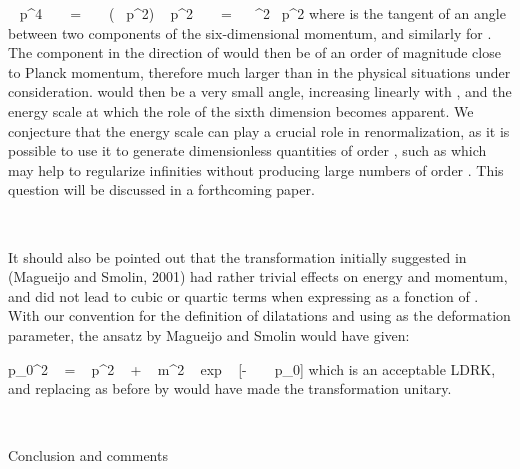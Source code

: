 \documentclass[a4paper,12pt,dvips]{article}
\makeatletter
\renewcommand{\section}{\@startsection{section}{1}{0in}
	{0.4\baselineskip}{0.1\baselineskip}{\Large\bf}}
\makeatother
\begin{document}
\equation
\epsilon ~ p^4 ~ ~ = ~ ~ (\epsilon ~ p^2) ~ p^2 ~ ~ = ~ ~\Omega ^2~ p^2
\endequation
\noindent 
where \coordHE{} is the tangent of an angle between two components of the six-dimensional momentum, and similarly for \coordHE{}. The component in the direction of \coordHE{} would then be of an order of magnitude close to Planck momentum, therefore much larger than \coordHE{} in the physical situations under consideration. \myHighlight{$\Omega $}\coordHE{} would then be a very small angle, increasing linearly with \coordHE{} , and \coordHE{} the energy scale at which the role of the sixth dimension becomes apparent. We conjecture that the energy scale \coordHE{} can play a crucial role in renormalization, as it is possible to use it to generate dimensionless quantities of order \coordHE{} , such as \coordHE{} which may help to regularize infinities without producing large numbers of order \coordHE{}. This question will be discussed in a forthcoming paper.

~ 

It should also be pointed out that the transformation initially suggested in (Magueijo and Smolin, 2001) had rather trivial effects on energy and momentum, and did not lead to cubic or quartic terms when expressing \coordHE{} as a fonction of \coordHE{}. With our convention for the definition of dilatations and using \myHighlight{$\mu $}\coordHE{} as the deformation parameter, the ansatz by Magueijo and Smolin would have given:

\equation
p_{0}^2 ~ = ~ p^2 ~ + ~ m^2 ~ exp ~ [- ~ \mu ~ p_0]
\endequation
\noindent
which is an acceptable LDRK, and replacing as before \coordHE{} by \coordHE{}
would have made the transformation unitary.

~ 

\section{Conclusion and comments}
\label{concl.sec}
\vspace{0.5ex}

~
\end{document}
